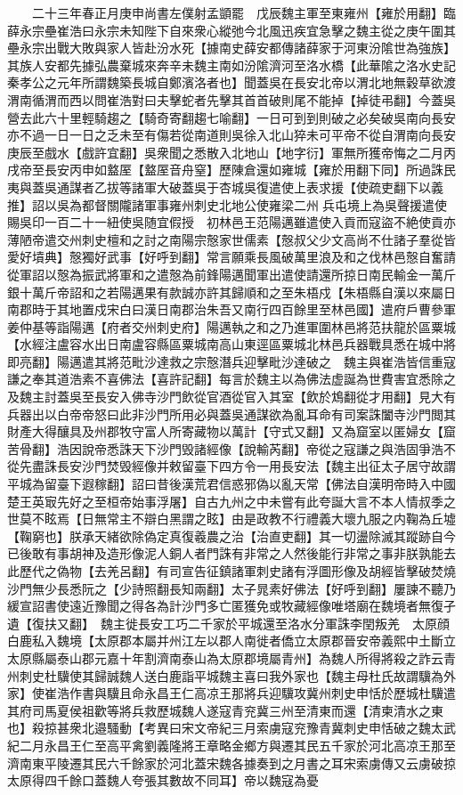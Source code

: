 　　二十三年春正月庚申尚書左僕射孟顗罷　戊辰魏主軍至東雍州【雍於用翻】臨薛永宗壘崔浩曰永宗未知陛下自來衆心縱弛今北風迅疾宜急擊之魏主從之庚午圍其壘永宗出戰大敗與家人皆赴汾水死【據南史薛安都傳諸薛家于河東汾隂世為強族】其族人安都先據弘農棄城來奔辛未魏主南如汾隂濟河至洛水橋【此華隂之洛水史記秦孝公之元年所謂魏築長城自鄭濱洛者也】聞蓋吳在長安北帝以渭北地無穀草欲渡渭南循渭而西以問崔浩對曰夫擊蛇者先擊其首首破則尾不能掉【掉徒弔翻】今蓋吳營去此六十里輕騎趨之【騎奇寄翻趨七喻翻】一日可到到則破之必矣破吳南向長安亦不過一日一日之乏未至有傷若從南道則吳徐入北山猝未可平帝不從自渭南向長安庚辰至戲水【戲許宜翻】吳衆聞之悉散入北地山【地字衍】軍無所獲帝悔之二月丙戌帝至長安丙申如盩厔【盩厔音舟窒】歷陳倉還如雍城【雍於用翻下同】所過誅民夷與蓋吳通謀者乙拔等諸軍大破蓋吳于杏城吳復遣使上表求援【使疏吏翻下以義推】詔以吳為都督關隴諸軍事雍州刺史北地公使雍梁二州兵屯境上為吳聲援遣使賜吳印一百二十一紐使吳随宜假授　初林邑王范陽邁雖遣使入貢而寇盜不絶使貢亦薄陋帝遣交州刺史檀和之討之南陽宗慤家世儒素【慤叔父少文高尚不仕諸子羣從皆愛好墳典】慤獨好武事【好呼到翻】常言願乘長風破萬里浪及和之伐林邑慤自奮請從軍詔以慤為振武將軍和之遣慤為前鋒陽邁聞軍出遣使請還所掠日南民輸金一萬斤銀十萬斤帝詔和之若陽邁果有款誠亦許其歸順和之至朱梧戍【朱梧縣自漢以來屬日南郡時于其地置戍宋白曰漢日南郡治朱吾又南行四百餘里至林邑國】遣府戶曹參軍姜仲基等詣陽邁【府者交州刺史府】陽邁執之和之乃進軍圍林邑將范扶龍於區粟城【水經注盧容水出日南盧容縣區粟城南高山東逕區粟城北林邑兵器戰具悉在城中將即亮翻】陽邁遣其將范毗沙達救之宗慤潛兵迎擊毗沙達破之　魏主與崔浩皆信重寇謙之奉其道浩素不喜佛法【喜許記翻】每言於魏主以為佛法虚誕為世費害宜悉除之及魏主討蓋吳至長安入佛寺沙門飲從官酒從官入其室【飲於鴆翻從才用翻】見大有兵器出以白帝帝怒曰此非沙門所用必與蓋吳通謀欲為亂耳命有司案誅闔寺沙門閲其財產大得釀具及州郡牧守富人所寄藏物以萬計【守式又翻】又為窟室以匿婦女【窟苦骨翻】浩因說帝悉誅天下沙門毁諸經像【說輸芮翻】帝從之寇謙之與浩固爭浩不從先盡誅長安沙門焚毁經像并敕留臺下四方令一用長安法【魏主出征太子居守故謂平城為留臺下遐稼翻】詔曰昔後漢荒君信惑邪偽以亂天常【佛法自漢明帝時入中國楚王英㝡先好之至桓帝始事浮屠】自古九州之中未嘗有此夸誕大言不本人情叔季之世莫不眩焉【日無常主不辯白黑謂之眩】由是政教不行禮義大壞九服之内鞠為丘墟【鞠窮也】朕承天緒欲除偽定真復羲農之治【治直吏翻】其一切盪除滅其蹤跡自今已後敢有事胡神及造形像泥人銅人者門誅有非常之人然後能行非常之事非朕孰能去此歷代之偽物【去羌呂翻】有司宣告征鎮諸軍刺史諸有浮圖形像及胡經皆擊破焚燒沙門無少長悉阮之【少詩照翻長知兩翻】太子晁素好佛法【好呼到翻】屢諫不聽乃緩宣詔書使遠近豫聞之得各為計沙門多亡匿獲免或牧藏經像唯塔廟在魏境者無復孑遺【復扶又翻】　魏主徙長安工巧二千家於平城還至洛水分軍誅李閏叛羌　太原顔白鹿私入魏境【太原郡本屬并州江左以郡人南徙者僑立太原郡晉安帝義熙中土斷立太原縣屬泰山郡元嘉十年割濟南泰山為太原郡境屬青州】為魏人所得將殺之詐云青州刺史杜驥使其歸誠魏人送白鹿詣平城魏主喜曰我外家也【魏主母杜氏故謂驥為外家】使崔浩作書與驥且命永昌王仁高凉王那將兵迎驥攻冀州刺史申恬於歷城杜驥遣其府司馬夏侯祖歡等將兵救歷城魏人遂寇青兖冀三州至清東而還【清柬清水之東也】殺掠甚衆北邉騷動【考異曰宋文帝紀三月索虜寇兖豫青冀刺史申恬破之魏太武紀二月永昌王仁至高平禽劉義隆將王章略金鄉方與遷其民五千家於河北高凉王那至濟南東平陵遷其民六千餘家於河北蓋宋魏各據奏到之月書之耳宋索虜傳又云虜破掠太原得四千餘口蓋魏人夸張其數故不同耳】帝以魏寇為憂